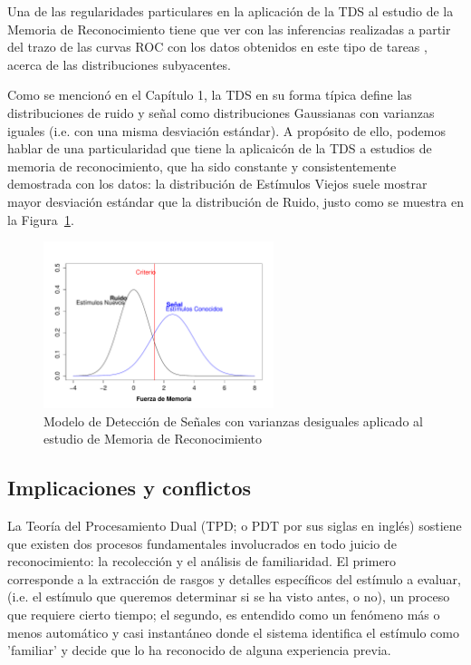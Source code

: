 Una de las regularidades particulares en la aplicación de la TDS al estudio de la Memoria de Reconocimiento tiene que ver con las inferencias realizadas a partir del trazo de las curvas ROC con los datos obtenidos en este tipo de tareas \parencite{VanZ2000, Ratcliff1992, Ratcliff1994}, acerca de las distribuciones subyacentes. 

Como se mencionó en el Capítulo 1, la TDS en su forma típica define las distribuciones de ruido y señal como distribuciones Gaussianas con varianzas iguales (i.e. con una misma desviación estándar). A propósito de ello, podemos hablar de una particularidad que tiene la aplicaicón de la TDS a estudios de memoria de reconocimiento, que ha sido constante y consistentemente demostrada con los datos: la distribución de Estímulos Viejos suele mostrar mayor desviación estándar que la distribución de Ruido, justo como se muestra en la Figura~\ref{fig:RM_SDT_2}.\\


\begin{figure}[th]
\centering
\includegraphics[width=0.60\textwidth]{Figures/RM_SDT_2} 
\decoRule
\caption[SDT en Memoria de Reconocimiento (Varianzas Desiguales)]{Modelo de Detección de Señales con varianzas desiguales aplicado al estudio de Memoria de Reconocimiento}
\label{fig:RM_SDT_2}
\end{figure}


\subsection{Implicaciones y conflictos}




\parencite{Wixted2007}

La Teoría del Procesamiento Dual (TPD; o PDT por sus siglas en inglés) sostiene que existen dos procesos fundamentales involucrados en todo juicio de reconocimiento: la recolección y el análisis de familiaridad. El primero corresponde a la extracción de rasgos y detalles específicos del estímulo a evaluar, (i.e. el estímulo que queremos determinar si se ha visto antes, o no), un proceso que requiere cierto tiempo; el segundo, es entendido como un fenómeno más o menos automático y casi instantáneo donde el sistema identifica el estímulo como 'familiar' y decide que lo ha reconocido de alguna experiencia previa. 

